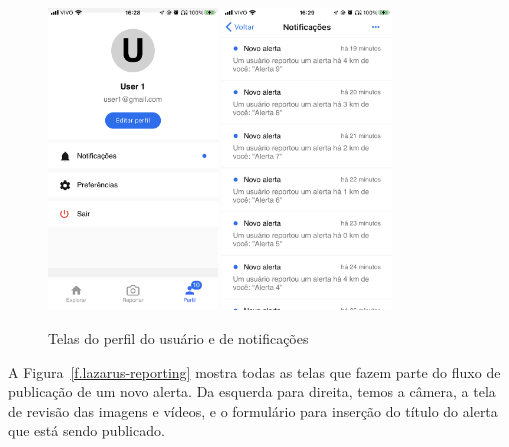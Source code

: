 \begin{figure}[htbp]
	\caption{\small Telas do perfil do usuário e de notificações} 
	\begin{center}
		\includegraphics[height=8cm]{images/lazarus-profile.png}
		\includegraphics[height=8cm]{images/lazarus-notifications.png}
	\end{center}
	\label{f.lazarus-profile}
\end{figure}

\FloatBarrier

A Figura~\ref{f.lazarus-reporting} mostra todas as telas que fazem parte do fluxo de publicação de um novo alerta. Da esquerda para direita, temos a câmera, a tela de revisão das imagens e vídeos, e o formulário para inserção do título do alerta que está sendo publicado.

